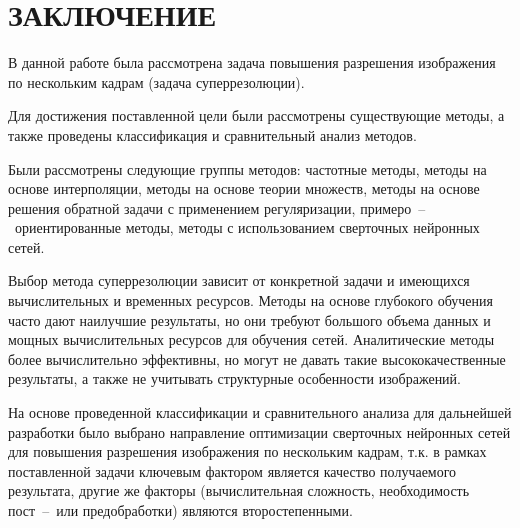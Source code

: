 \chapter*{ЗАКЛЮЧЕНИЕ}

В данной работе была рассмотрена задача повышения разрешения изображения по нескольким кадрам (задача суперрезолюции).

Для достижения поставленной цели были рассмотрены существующие методы, а также проведены классификация и сравнительный анализ методов.

Были рассмотрены следующие группы методов: частотные методы, методы на основе интерполяции, методы на основе теории множеств, методы на основе решения обратной задачи с применением регуляризации, примеро~--~ориентированные методы, методы с использованием сверточных нейронных сетей.

Выбор метода суперрезолюции зависит от конкретной задачи и имеющихся вычислительных и временных ресурсов. Методы на основе глубокого обучения часто дают наилучшие результаты, но они требуют большого объема данных и мощных вычислительных ресурсов для обучения сетей. Аналитические методы более вычислительно эффективны, но могут не давать такие высококачественные результаты, а также не учитывать структурные особенности изображений.

На основе проведенной классификации и сравнительного анализа для дальнейшей разработки было выбрано направление оптимизации сверточных нейронных сетей для повышения разрешения изображения по нескольким кадрам, т.к. в рамках поставленной задачи ключевым фактором является качество получаемого результата, другие же факторы (вычислительная сложность, необходимость пост~--~или предобработки) являются второстепенными.

